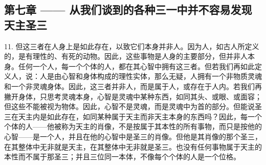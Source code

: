 \subsection{第七章 —— 从我们谈到的各种三一中并不容易发现天主圣三}

11. 但这三者在人身上是如此存在，以致它们本身并非人。因为人，如古人所定义的，是有理性的、有死的动物。因此，这些事物是人身的主要部分，但并非人本身。任何一个人，每一个个体的人，都在其心智中拥有这三者。但若我们再如此定义人，说：人是由心智和身体构成的理性实体，那么无疑，人拥有一个非物质灵魂和一个非灵魂身体。因此，这三者并非人，而是属于人，或存在于人内。若我们再撇开身体，只思考灵魂本身，心智是灵魂中某种东西，如同其头、或眼、或面容；但这些不能被视为物体。因此，心智不是灵魂，而是灵魂中为首的部分。但能说圣三在天主内是如此存在，如同某种属于天主而非天主本身的东西吗？因此，每一个个体的人——他被称为天主的肖像，不是按属于其本性的所有事物，而只是按他的心智——是一个人，并且在他的心智中是圣三的肖像。但他是其肖像的那个圣三，在其整体中无非就是天主，在其整体中无非就是圣三。也没有任何事物属于天主的本性而不属于那圣三；并且三位同一本体，不像每个个体的人是一个位格。\par

